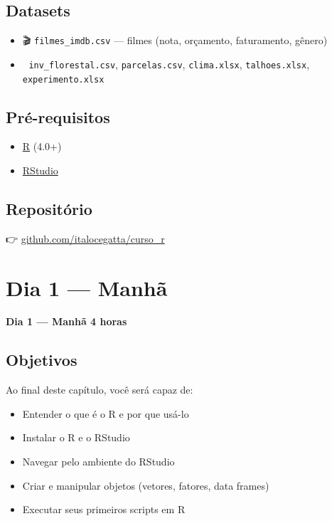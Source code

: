 \documentclass[
  letterpaper,
]{scrbook}
\providecommand{\tightlist}{%
  \setlength{\itemsep}{0pt}\setlength{\parskip}{0pt}}
\begin{document}
\section{Datasets}\label{datasets-2}

\begin{itemize}
\tightlist
\item
  🎬 \texttt{filmes\_imdb.csv} --- filmes (nota, orçamento, faturamento,
  gênero)
\item
  🌲 \texttt{inv\_florestal.csv}, \texttt{parcelas.csv},
  \texttt{clima.xlsx}, \texttt{talhoes.xlsx}, \texttt{experimento.xlsx}
\end{itemize}

\section{Pré-requisitos}\label{pruxe9-requisitos-3}

\begin{itemize}
\tightlist
\item
  \href{https://cran.r-project.org/}{R} (4.0+)
\item
  \href{https://posit.co/download/rstudio-desktop/}{RStudio}
\end{itemize}

\section{Repositório}\label{reposituxf3rio-3}

👉
\href{https://github.com/italocegatta/curso_r}{github.com/italocegatta/curso\_r}

\chapter{Dia 1 --- Manhã}\label{dia-1-manhuxe3-2}

\textbf{Dia 1 --- Manhã \textbar{} 4 horas}

\section*{Objetivos}\label{objetivos}


Ao final deste capítulo, você será capaz de:

\begin{itemize}
\tightlist
\item
  Entender o que é o R e por que usá-lo
\item
  Instalar o R e o RStudio
\item
  Navegar pelo ambiente do RStudio
\item
  Criar e manipular objetos (vetores, fatores, data frames)
\item
  Executar seus primeiros scripts em R
\end{itemize}
\end{document}
